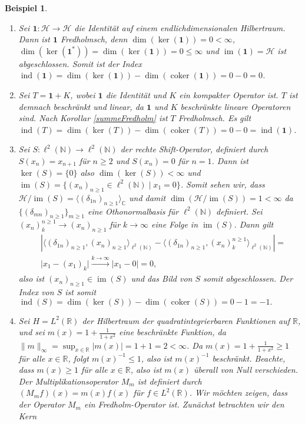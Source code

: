 \documentclass[11pt, hidelinks]{article}
\newcommand{\h}{\mathcal{H}}
\newcommand{\im}{\operatorname{im}}
\newcommand{\coker}{\operatorname{coker}}
\numberwithin{conj}{section}
\newtheorem{example}[conj]{Beispiel}
\begin{document}
\begin{example}\noindent
    \begin{enumerate}
        \item Sei $\mathbf{1}: \h \to \h$ die Identität auf einem endlichdimensionalen Hilbertraum. Dann ist $\mathbf{1}$ Fredholmsch, denn $\dim(\ker(\mathbf{1})) = 0 < \infty$, $\dim(\ker(\mathbf{1}^\ast)) = \dim(\ker(\mathbf{1})) = 0 \leq \infty$ und $\im(\mathbf{1}) = \h$ ist abgeschlossen. Somit ist der Index $\operatorname{ind}(\mathbf{1}) = \dim(\ker(\mathbf{1})) - \dim(\operatorname{coker}(\mathbf{1})) = 0 - 0 = 0$.
        \item Sei \( T = \mathbf{1} + K \), wobei \( \mathbf{1} \) die Identität und \( K \) ein kompakter Operator ist. \( T \) ist demnach beschränkt und linear, da \( \mathbf{1} \) und \( K \) beschränkte lineare Operatoren sind. Nach Korollar \ref{summeFredholm} ist $T$ Fredholmsch. Es gilt $\operatorname{ind}(T) = \dim(\ker(T)) - \dim(\coker(T)) = 0 - 0 = \operatorname{ind}(\mathbf{1})$.
        \item Sei $S: \ell^2(\mathbb{N}) \to \ell^2(\mathbb{N})$ der rechte Shift-Operator, definiert durch $S(x_n) = x_{n+1}$ für $n \geq 2$ und $S(x_n) = 0$ für $n=1$. Dann ist $\ker(S) = \{0\}$ also $\dim(\ker(S)) < \infty$ und $\im(S) = \{ (x_n)_{n \geq 1} \in \ell^2(\mathbb{N}) \; \vert \; x_1 = 0\}$. Somit sehen wir, dass $\h/\im(S) = \langle (\delta_{1n})_{n \geq 1} \rangle_{\mathbb{C}}$ und damit $\dim(\h/\im(S)) = 1 < \infty$ da $\{(\delta_{mn})_{n \geq 1}\}_{m \geq 1}$ eine Othonormalbasis für $\ell^2(\mathbb{N})$ definiert. Sei $(x_n)^{n \geq 1}_k \to (x_n)_{n \geq 1}$ für $k \to \infty$ eine Folge in $\im(S)$. Dann gilt
        \begin{align}
            &\left\vert \langle (\delta_{1n})_{n \geq 1}, (x_n)_{n \geq 1} \rangle_{\ell^2(\mathbb{N})} - \langle (\delta_{1n})_{n \geq 1}, (x_n)^{n \geq 1}_k \rangle_{\ell^2(\mathbb{N})} \right\vert = \nonumber\\
            & \vert x_1 - (x_1)_k \vert \nonumber \xrightarrow[]{k \to \infty} \vert x_1 - 0 \vert = 0,
        \end{align}
        also ist $(x_n)_{n \geq 1} \in \im(S)$ und das Bild von $S$ somit abgeschlossen. Der Index von \( S \) ist somit $\operatorname{ind}(S) = \dim(\ker(S)) - \dim(\operatorname{coker}(S)) = 0 - 1 = -1.$
        \item Sei \( H = L^2(\mathbb{R}) \) der Hilbertraum der quadratintegrierbaren Funktionen auf \( \mathbb{R} \), und sei $m(x) = 1 + \frac{1}{1 + x^2}$ eine beschränkte Funktion, da $\|m\|_\infty = \sup_{x \in \mathbb{R}} |m(x)| = 1 + 1 = 2 < \infty$. Da \( m(x) = 1 + \frac{1}{1 + x^2} \geq 1 \) für alle \( x \in \mathbb{R} \), folgt \( m(x)^{-1} \leq 1 \), also ist \( m(x)^{-1} \) beschränkt. Beachte, dass \( m(x) \geq 1 \) für alle \( x \in \mathbb{R} \), also ist \( m(x) \) überall von Null verschieden. Der Multiplikationsoperator \( M_m \) ist definiert durch $(M_m f)(x) = m(x) f(x)$ für $f \in L^2(\mathbb{R})$. Wir möchten zeigen, dass der Operator \( M_m \) ein Fredholm-Operator ist. Zunächst betrachten wir den Kern

\end{enumerate}
\end{example}
\end{document}
